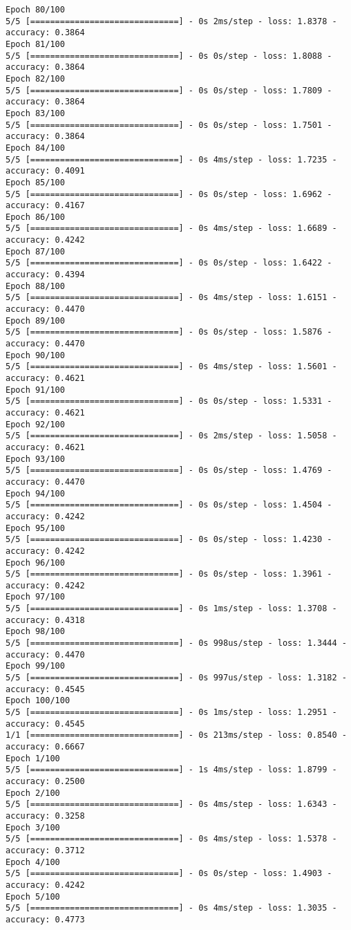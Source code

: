 \documentclass[12pt]{article}
\begin{document}
\begin{lstlisting}
Epoch 80/100
5/5 [==============================] - 0s 2ms/step - loss: 1.8378 - accuracy: 0.3864
Epoch 81/100
5/5 [==============================] - 0s 0s/step - loss: 1.8088 - accuracy: 0.3864
Epoch 82/100
5/5 [==============================] - 0s 0s/step - loss: 1.7809 - accuracy: 0.3864
Epoch 83/100
5/5 [==============================] - 0s 0s/step - loss: 1.7501 - accuracy: 0.3864
Epoch 84/100
5/5 [==============================] - 0s 4ms/step - loss: 1.7235 - accuracy: 0.4091
Epoch 85/100
5/5 [==============================] - 0s 0s/step - loss: 1.6962 - accuracy: 0.4167
Epoch 86/100
5/5 [==============================] - 0s 4ms/step - loss: 1.6689 - accuracy: 0.4242
Epoch 87/100
5/5 [==============================] - 0s 0s/step - loss: 1.6422 - accuracy: 0.4394
Epoch 88/100
5/5 [==============================] - 0s 4ms/step - loss: 1.6151 - accuracy: 0.4470
Epoch 89/100
5/5 [==============================] - 0s 0s/step - loss: 1.5876 - accuracy: 0.4470
Epoch 90/100
5/5 [==============================] - 0s 4ms/step - loss: 1.5601 - accuracy: 0.4621
Epoch 91/100
5/5 [==============================] - 0s 0s/step - loss: 1.5331 - accuracy: 0.4621
Epoch 92/100
5/5 [==============================] - 0s 2ms/step - loss: 1.5058 - accuracy: 0.4621
Epoch 93/100
5/5 [==============================] - 0s 0s/step - loss: 1.4769 - accuracy: 0.4470
Epoch 94/100
5/5 [==============================] - 0s 0s/step - loss: 1.4504 - accuracy: 0.4242
Epoch 95/100
5/5 [==============================] - 0s 0s/step - loss: 1.4230 - accuracy: 0.4242
Epoch 96/100
5/5 [==============================] - 0s 0s/step - loss: 1.3961 - accuracy: 0.4242
Epoch 97/100
5/5 [==============================] - 0s 1ms/step - loss: 1.3708 - accuracy: 0.4318
Epoch 98/100
5/5 [==============================] - 0s 998us/step - loss: 1.3444 - accuracy: 0.4470
Epoch 99/100
5/5 [==============================] - 0s 997us/step - loss: 1.3182 - accuracy: 0.4545
Epoch 100/100
5/5 [==============================] - 0s 1ms/step - loss: 1.2951 - accuracy: 0.4545
1/1 [==============================] - 0s 213ms/step - loss: 0.8540 - accuracy: 0.6667
Epoch 1/100
5/5 [==============================] - 1s 4ms/step - loss: 1.8799 - accuracy: 0.2500
Epoch 2/100
5/5 [==============================] - 0s 4ms/step - loss: 1.6343 - accuracy: 0.3258
Epoch 3/100
5/5 [==============================] - 0s 4ms/step - loss: 1.5378 - accuracy: 0.3712
Epoch 4/100
5/5 [==============================] - 0s 0s/step - loss: 1.4903 - accuracy: 0.4242
Epoch 5/100
5/5 [==============================] - 0s 4ms/step - loss: 1.3035 - accuracy: 0.4773

\end{lstlisting}
\end{document}
